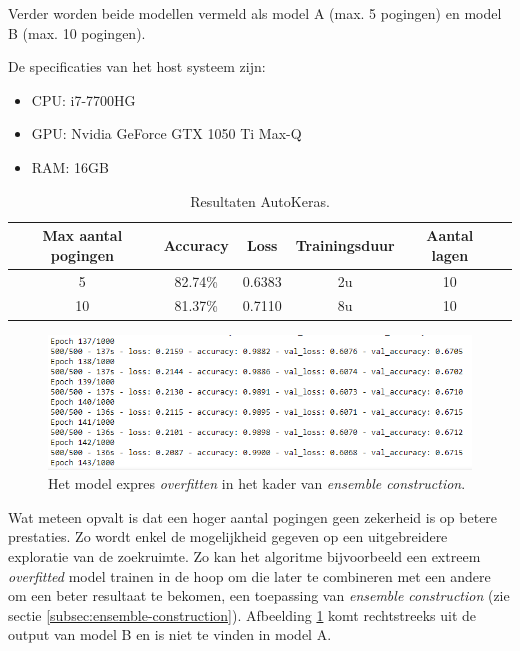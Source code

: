 Verder worden beide modellen vermeld als model A (max. 5 pogingen) en model B (max. 10 pogingen).

\begin{minipage}{\textwidth}
    De specificaties van het host systeem zijn:
    \begin{itemize}
        \item CPU: i7-7700HG
        \item GPU: Nvidia GeForce GTX 1050 Ti Max-Q
        \item RAM: 16GB
    \end{itemize}
\end{minipage}

\bigskip

\begin{table}[ht]
    \centering
    \begin{tabular}{c c c c c c} %
        \hline\hline %
        Max aantal pogingen & Accuracy & Loss & Trainingsduur & Aantal lagen \\ [0.5ex] %
        \hline %
        5   & 82.74\%   & 0.6383   & 2u    & 10 \\ 
        \hline %
        10   & 81.37\%   & 0.7110   & 8u    & 10 \\ 
        \hline
    \end{tabular}
    \caption{Resultaten AutoKeras.}
    \label{table:autokeras-results}
\end{table}

\begin{figure}[b!]
    \centering
    \includegraphics[width=\linewidth]{img/autokeras-overfit.png}
    \caption{Het model expres \textit{overfitten} in het kader van \textit{ensemble construction}.}
    \label{fig:autokeras-overfit}
\end{figure}

Wat meteen opvalt is dat een hoger aantal pogingen geen zekerheid is op betere prestaties. Zo wordt enkel de mogelijkheid gegeven op een uitgebreidere exploratie van de zoekruimte. Zo kan het algoritme bijvoorbeeld een extreem \textit{overfitted} model trainen in de hoop om die later te combineren met een andere om een beter resultaat te bekomen, een toepassing van \textit{ensemble construction} (zie sectie \ref{subsec:ensemble-construction}). Afbeelding \ref{fig:autokeras-overfit} komt rechtstreeks uit de output van model B en is niet te vinden in model A.

